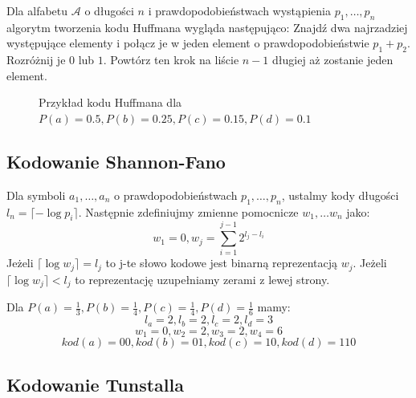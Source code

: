 \documentclass{../notatki}
\begin{document}
Dla alfabetu $\mathcal{A}$ o długości $n$ i prawdopodobieństwach
wystąpienia $p_1, \dots, p_n$ algorytm tworzenia kodu Huffmana wygląda
następująco:
Znajdź dwa najrzadziej występujące elementy i połącz je w jeden element
o prawdopodobieństwie $p_1 + p_2$. Rozróżnij je $0$ lub $1$. Powtórz
ten krok na liście $n-1$ długiej aż zostanie jeden element.

\begin{figure}[h]
  \centering
  \caption{Przykład kodu Huffmana dla $P(a) = 0.5, P(b) = 0.25, P(c)
  = 0.15, P(d) = 0.1$}
\end{figure}

\subsection{Kodowanie Shannon-Fano}

Dla symboli $a_1, \dots, a_n$ o prawdopodobieństwach $p_1, \dots, p_n$,
ustalmy kody długości $l_n = \lceil - \log p_i \rceil$. Następnie
zdefiniujmy zmienne pomocnicze $w_1, \dots w_n$ jako:
$$
w_1 = 0, w_j = \sum_{i=1}^{j-1}2^{l_j - l_i}
$$
Jeżeli $\lceil \log w_j \rceil = l_j$ to j-te słowo kodowe jest binarną
reprezentacją $w_j$. Jeżeli $\lceil \log w_j \rceil < l_j$ to reprezentację
uzupełniamy zerami z lewej strony.

Dla $P(a) = \frac{1}{3}, P(b) = \frac{1}{4}, P(c) = \frac{1}{4}, P(d)
= \frac{1}{6}$ mamy:
$$
l_a = 2, l_b = 2, l_c = 2, l_d = 3
$$
$$
w_1 = 0, w_2 = 2, w_3 = 2, w_4 = 6
$$
$$
kod(a) = 00, kod(b) = 01, kod(c) = 10, kod(d) = 110
$$

\subsection{Kodowanie Tunstalla}
\end{document}
